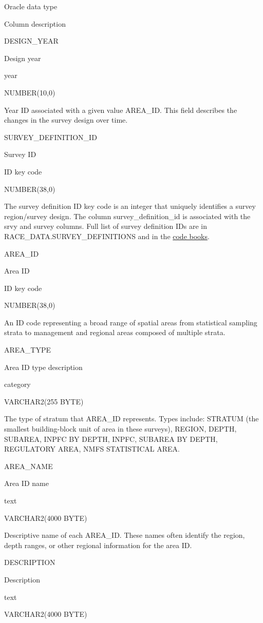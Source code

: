 \documentclass[
  letterpaper,
  oneside,
  open=any]{scrbook}
\begin{document}
Oracle data type

Column description

DESIGN\_YEAR

Design year

year

NUMBER(10,0)

Year ID associated with a given value AREA\_ID. This field describes the
changes in the survey design over time.

SURVEY\_DEFINITION\_ID

Survey ID

ID key code

NUMBER(38,0)

The survey definition ID key code is an integer that uniquely identifies
a survey region/survey design. The column survey\_definition\_id is
associated with the srvy and survey columns. Full list of survey
definition IDs are in RACE\_DATA.SURVEY\_DEFINITIONS and in the
\href{https://www.fisheries.noaa.gov/resource/document/groundfish-survey-species-code-manual-and-data-codes-manual}{code
books}.

AREA\_ID

Area ID

ID key code

NUMBER(38,0)

An ID code representing a broad range of spatial areas from statistical
sampling strata to management and regional areas composed of multiple
strata.

AREA\_TYPE

Area ID type description

category

VARCHAR2(255 BYTE)

The type of stratum that AREA\_ID represents. Types include: STRATUM
(the smallest building-block unit of area in these surveys), REGION,
DEPTH, SUBAREA, INPFC BY DEPTH, INPFC, SUBAREA BY DEPTH, REGULATORY
AREA, NMFS STATISTICAL AREA.

AREA\_NAME

Area ID name

text

VARCHAR2(4000 BYTE)

Descriptive name of each AREA\_ID. These names often identify the
region, depth ranges, or other regional information for the area ID.

DESCRIPTION

Description

text

VARCHAR2(4000 BYTE)
\end{document}
